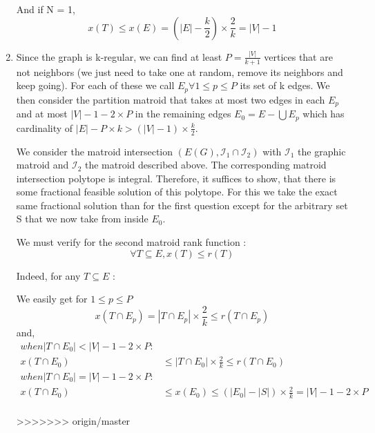 \documentclass{scrartcl}
\newcommand\1{\mathbf{1}}
\begin{document}
\begin{enumerate}
And if N = 1,
\[
x(T) \leq x(E) = (|E| - \frac{k}{2}) \times \frac{2}{k} = |V| - 1
\]
\item
Since the graph is k-regular, we can find at least $P = \frac{|V|}{k+1}$ vertices that are not neighbors (we just need to take one at random, remove its neighbors and keep going). For each of these we call $E_p \forall 1 \leq p \leq P$ its set of k edges. We then consider the partition matroid that takes at most two edges in each $E_p$ and at most $|V| - 1 - 2 \times P$ in the remaining edges $E_0 = E-\bigcup E_p$ which has cardinality of $|E| - P \times k > (|V| - 1) \times \frac{k}{2}$.

We consider the matroid intersection $(E(G), \mathcal{I}_1\cap \mathcal{I}_2)$ with $\mathcal{I}_1$ the graphic matroid and $\mathcal{I}_2$ the matroid described above. The corresponding matroid intersection polytope is integral. Therefore, it suffices to show, that there is some fractional feasible solution of this polytope. For this we take the exact same fractional solution than for the first question except for the arbitrary set S that we now take from inside $E_0$.

We must verify for the second matroid rank function :
\[
\forall T \subseteq E, x(T) \leq r(T)
\]

Indeed, for any $T\subseteq E$ : 

We easily get for $1 \leq p \leq P$
\[ 
x(T\cap E_p) = |T\cap E_p| \times \frac{2}{k} \leq r(T\cap E_p)
\]
and,
\begin{align*}
when |T\cap E_0| < |V| - 1 - 2 \times P :&\\
x(T\cap E_0) & \leq |T\cap E_0| \times \frac{2}{k} \leq r(T\cap E_0)\\
when |T\cap E_0| = |V| - 1 - 2 \times P :&\\
x(T\cap E_0) & \leq x(E_0) \leq (|E_0| - |S|) \times \frac{2}{k} = |V| - 1 - 2 \times P\\
\end{align*}



>>>>>>> origin/master
\end{enumerate}
\end{document}
